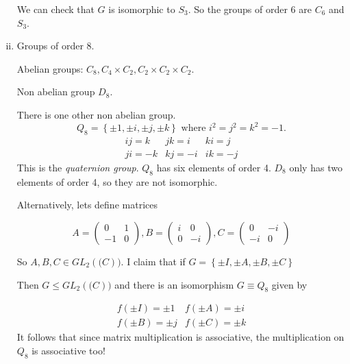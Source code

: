 \documentclass{article}
\theoremstyle{definition} \newtheorem*{definition}{Definition}
\begin{document}
\begin{enumerate}[(i)]
We can check that  $G$ is isomorphic to $S_3$. So the groups of order 6 are
$C_6$ and $S_3$.

\item Groups of order 8.

  Abelian groups: $C_8,C_4\times C_2, C_2 \times C_2 \times C_2.$ 

  Non abelian group $D_8$.

  There is one other non abelian group.  \begin{equation*} Q_8 = \left\{ \pm1,
    \pm i, \pm j, \pm k \right\} \text{ where } i^2=j^2=k^2=-1.  \label{}
  \end{equation*} \begin{equation*} \begin{matrix} ij=k & jk=i & ki=j \\ ji=-k
      & kj=-i & ik=-j \end{matrix} \end{equation*} This is the \emph{quaternion
  group}.  $Q_8$ has six elements of order 4.  $D_8$ only has two elements of
  order 4, so they are not isomorphic.

  Alternatively, lets define matrices

  \begin{equation*} A = \left( \begin{matrix} 0 & 1 \\ -1 & 0 \end{matrix}
    \right), B = \left( \begin{matrix} i & 0 \\ 0 & -i \end{matrix} \right), C
    = \left( \begin{matrix} 0 & -i \\ -i & 0 \end{matrix} \right) \label{}
  \end{equation*}

  So $A,B,C \in GL_2(\mathbb(C))$. I claim that if $G = \left\{ \pm I, \pm A,
  \pm B, \pm C \right\}$

  Then $G \leq GL_2(\mathbb(C))$ and there is an isomorphism $G \equiv Q_8$
  given by 

  \begin{equation*} \begin{matrix} f(\pm I ) = \pm 1 & f(\pm A) = \pm i \\
      f(\pm B ) = \pm j & f(\pm C ) = \pm k \end{matrix} \label{}
  \end{equation*} It follows that since matrix multiplication is associative,
  the multiplication on $Q_8$ is associative too!


\end{enumerate}
\end{document}
